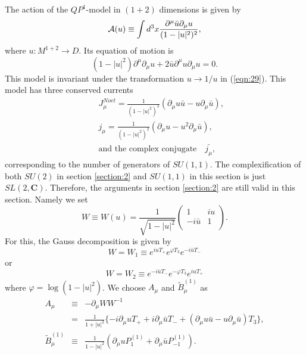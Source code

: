 \documentclass[makeidx,12pt,openany]{report}
\begin{document}
The action of the $QP^1$-model in $(1+2)$ dimensions is given by 
\begin{equation}
 \mbox{$\cal{A}$}(u) \equiv \int d^3 x \frac{\partial^{\mu}\bar{u}\partial_{\mu}u}
                             {(1-|u|^2)^2},
\end{equation}
where \quad $u:M^{1+2} \rightarrow D$. Its equation of motion is 
\begin{equation}
 (1-|u|^2)\partial^{\mu}\partial_{\mu}u
  +2\bar{u}\partial^{\mu}u\partial_{\mu}u =0.
\end{equation}
This model is invariant under the transformation $ u \rightarrow 1/u
$ in (\ref{eqn:29}). This model has three conserved currents
\begin{eqnarray}
 && J_{\mu}^{Noet}=\frac{1}{(1-|u|^2)^2}
       (\partial_{\mu}u \bar{u}-u\partial_{\mu}\bar{u}), \label{eqn:65}\\
 && j_{\mu}=\frac{1}{(1-|u|^2)^2}
       (\partial_{\mu}u -u^2 \partial_{\mu}\bar{u}), \label{eqn:66}\\
 && \mbox{and the complex conjugate} \quad \bar{j_{\mu}},
 \label{eqn:67}
\end{eqnarray}
corresponding to the number of generators of $SU(1,1)$. The complexification of both $SU(2)$ in section \ref{section:2} and $SU(1,1)$ in this section is just $SL(2,\mathbf{C})$. Therefore, the arguments in section \ref{section:2} are still valid in this section. Namely we set
\begin{equation}
 W \equiv W(u)=
          \frac{1}{\sqrt{1-|u|^2}}
           \left(
            \begin{array}{cc}
               1     & iu \\
           -i\bar{u} & 1 \\
            \end{array}
           \right) .
\end{equation} 
For this, the Gauss decomposition is given by
\begin{equation}
 W=W_1 \equiv e^{iuT_{+}}e^{\varphi T_3}e^{-i\bar{u}T_{-}}
\end{equation}
or
\begin{equation}
 W=W_2 \equiv e^{-i\bar{u}T_{-}}e^{-\varphi T_3}e^{iuT_{+}}
\end{equation}
where $\varphi = \log{(1-|u|^2)}$. We choose $A_{\mu}$ and $\tilde{B}_{\mu}^{(1)}$ as 
\begin{eqnarray}
 A_{\mu} & \equiv & -\partial_{\mu}W W^{-1} \nonumber\\
         & = & \frac{1}{1+|u|^2}
               \{ -i\partial_{\mu}u T_{+}+i\partial_{\mu}\bar{u} T_{-}+
                  (\partial_{\mu}u \bar{u}-u\partial_{\mu}\bar{u})T_3 \}, \\
 \tilde{B}_{\mu}^{(1)} & \equiv & \frac{1}{1-|u|^2}
             (\partial_{\mu}u P_1^{(1)}+\partial_{\mu}\bar{u} P_{-1}^{(1)}).
 \label{eqn:72}
\end{eqnarray}
\end{document}

